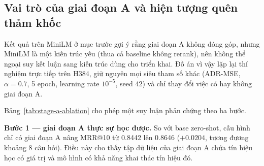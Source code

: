 \documentclass[../DoAn.tex]{subfiles}
\begin{document}
\subsection{Vai trò của giai đoạn A và hiện tượng quên thảm khốc}
\label{subsection:stage-a}

Kết quả trên MiniLM ở mục trước gợi ý rằng giai đoạn A không đóng góp, nhưng MiniLM là một kiến trúc yếu (thua cả baseline không rerank), nên không thể ngoại suy kết luận sang kiến trúc dùng cho triển khai. Đồ án vì vậy lặp lại thí nghiệm trực tiếp trên H384, giữ nguyên mọi siêu tham số khác (ADR-MSE, $\alpha=0.7$, 5 epoch, learning rate $10^{-5}$, seed 42) và chỉ thay đổi việc có hay không giai đoạn A.

\begin{table}[H]
    \centering
    \caption{Vai trò của giai đoạn A trên H384 (ADR-MSE, $\alpha=0.7$)}
    \label{tab:stage-a-ablation}
    {\small
    \setlength{\tabcolsep}{4pt}
    }
\end{table}

Bảng~\ref{tab:stage-a-ablation} cho phép một suy luận phản chứng theo ba bước.

\noindent\textbf{Bước 1 --- giai đoạn A thực sự học được.} So với base zero-shot, cấu hình chỉ có giai đoạn A nâng MRR@10 từ 0.8442 lên 0.8646 ($+0.0204$, tương đương khoảng 8 câu hỏi). Điều này cho thấy tập dữ liệu của giai đoạn A chứa tín hiệu học có giá trị và mô hình có khả năng khai thác tín hiệu đó.
\end{document}
